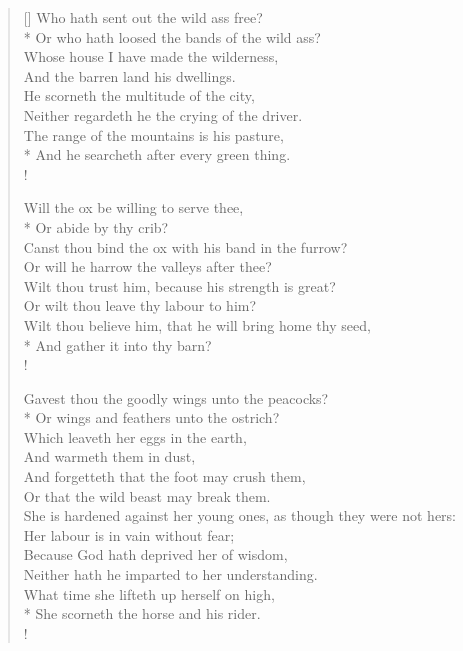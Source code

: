 \documentclass[MAIN]{subfiles}
\begin{document}
\begin{verse}[\versewidth]
Who hath sent out the wild ass free?\\*
\vin Or who hath loosed the bands of the wild ass?\\
Whose house I have made the wilderness,\\
\vin And the barren land his dwellings.\\
He scorneth the multitude of the city,\\
\vin Neither regardeth he the crying of the driver.\\
The range of the mountains is his pasture,\\*
\vin And he searcheth after every green thing.\\!

Will the ox be willing to serve thee,\\*
\vin Or abide by thy crib?\\
Canst thou bind the ox with his band in the furrow?\\
\vin Or will he harrow the valleys after thee?\\
Wilt thou trust him, because his strength is great?\\
\vin Or wilt thou leave thy labour to him?\\
Wilt thou believe him, that he will bring home thy seed,\\*
\vin And gather it into thy barn?\\!

Gavest thou the goodly wings unto the peacocks?\\*
\vin Or wings and feathers unto the ostrich?\\
Which leaveth her eggs in the earth,\\
\vin And warmeth them in dust,\\
And forgetteth that the foot may crush them,\\
\vin Or that the wild beast may break them.\\
She is hardened against her young ones, as though they were not hers:\\
\vin Her labour is in vain without fear;\\
Because God hath deprived her of wisdom,\\
\vin Neither hath he imparted to her understanding.\\
What time she lifteth up herself on high,\\*
\vin She scorneth the horse and his rider.\\!


\end{verse}
\end{document}
